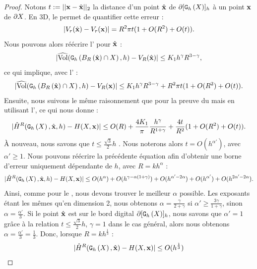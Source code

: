 \begin{proof}
%
Notons $t \EqDef ||\vx-\vxH||_2$ la distance d'un point $\vxH$ de
$\Bd{\Body{\DSh}{h}}$ à un point $\vx$ de $\dS$. En 3D, le
 permet de quantifier cette erreur :
%
\begin{equation}\label{eq:volume-shift-error-2}
  | V_r(\vxH) - V_r(\vx) | = R^2 \pi t (1 + O(R^2)+O(t)).
\end{equation}
%
Nous pouvons alors réécrire l'
pour $\vxH$ :
%
\begin{equation}
  | \VolC(\DigF{\Ball{R}{\vxH} \cap \Shape}{h}, h) - V_R(\vxH) | \le K_1 h^\gamma R^{3-\gamma},
\end{equation}
%
ce qui implique, avec l' :
%
\begin{equation}\label{eq:shift-B-R-error-bound-3D}
  | \VolC(\DigF{\Ball{R}{\vxH} \cap \Shape}{h}, h) - V_R(\vx) |  \le K_1 h^\gamma R^{3-\gamma} +  R^2 \pi t (1 + O(R^2) + O(t)).
\end{equation}
%
Ensuite, nous suivons le même raisonnement que pour la preuve du
 mais en utilisant
l', ce qui nous donne :
%
\begin{equation}\label{eq:shift-curvhat-error-bound-3D}
  | \MeanCurvH{R}(\DSh,\vxH,h) - \MeanCurv(\Shape,\vx) | \le O(R) + \frac{4 K_1}{\pi} \frac{h^\gamma}{R^{1+\gamma}} + \frac{4 t}{R^2}(1 + O(R^2) + O(t)).
\end{equation}
%
À nouveau, nous savons que $t \le \frac{\sqrt{3}}{2}h$ \cite{Lachaud2015}. Nous noterons alors
$t = O(h^{\alpha'})$, avec $\alpha' \ge 1$. Nous pouvons réécrire la
précédente équation afin d'obtenir une borne d'erreur uniquement dépendante de
$h$, avec $R=kh^{\alpha}$ :
%
\begin{equation} \label{eq:shift-meancurvhat-error-bound-h-only}
  | \MeanCurvH{R}(\DSh,\vxH,h) - \MeanCurv(\Shape,\vx) |
  \le O(h^\alpha) + O(h^{\gamma-\alpha(1+\gamma)}) + O(h^{\alpha'-2\alpha})
    + O(h^{\alpha'}) + O(h^{2\alpha'-2\alpha}).
\end{equation}
%
Ainsi, comme pour le , nous devons trouver
le meilleur $\alpha$ possible. Les exposants étant les mêmes qu'en dimension 2, nous
obtenons $\alpha = \frac{\gamma}{2 + \gamma}$ si $\alpha' \ge \frac{3 \gamma}{1 +
\gamma}$, sinon $\alpha = \frac{\alpha'}{3}$.
%
Si le point $\vxH$ est sur le bord digital $\Bd{\Body{\DSh}{h}}$, nous
savons que $\alpha'=1$ grâce à la relation $t \le \frac{\sqrt{3}}{2}h$, $\gamma =
1$ dans le cas général, alors nous obtenons $\alpha = \frac{\alpha'}{3} =
\frac{1}{3}$. Donc, lorsque $R = kh^{\frac{1}{3}}$ :
%
\begin{equation}
  | \MeanCurvH{R}(\DSh,\vxH) - \MeanCurv(\Shape,\vx) | \le O(h^{\frac{1}{3}})
\end{equation}
%
\end{proof}

